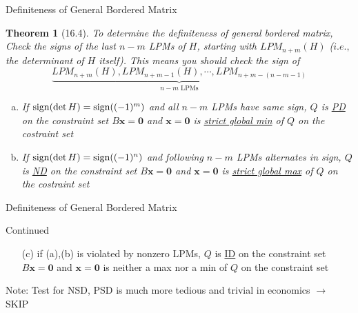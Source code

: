 \documentclass[a4paper,11pt]{article}
\newtheorem{thm}{Theorem}
\newcommand{\bd}{\mathbf}
\begin{document}
\begin{frame}[t]{Definiteness of General Bordered Matrix}
	\begin{thm}
		[16.4] To determine the definiteness of general bordered matrix, Check the signs of the last $n-m$ LPMs of $H$, starting with $LPM_{n+m}(H)$ ($i.e.,$ the determinant of $H$ itself). This means you should check the sign of \[
			\underbrace{LPM_{n+m}(H), LPM_{n+m-1}(H), \cdots,LPM_{n+m-(n-m-1)}}_{n-m\text{ LPMs}}
		\]
		\begin{enumerate}[(a)]
			\item If ${\rm sign}(\det H)={\rm sign}((-1)^m)$ and all $n-m$ LPMs have same sign, $Q$ is \uline{PD} on the constraint set $B\bd{x}=\bd{0}$ and $\bd{x}=\bd 0$ is \uline{strict global min} of $Q$ on the costraint set
			\item If ${\rm sign}(\det H)={\rm sign}((-1)^n)$ and following $n-m$ LPMs alternates in sign, $Q$ is \uline{ND} on the constraint set $B\bd{x}=\bd{0}$ and $\bd{x}=\bd 0$ is \uline{strict global max} of $Q$ on the costraint set
		\end{enumerate}
	\end{thm}
\end{frame}

\begin{frame}[t]{Definiteness of General Bordered Matrix}
	\begin{block}
		{Continued}
		\begin{enumerate}[(a)]
			\item [(c)] if (a),(b) is violated by nonzero LPMs, $Q$ is \uline{ID} on the constraint set $B\bd{x}=\bd{0}$ and $\bd{x}=\bd 0$ is neither a max nor a min of $Q$ on the constraint set
		\end{enumerate}
	\end{block}
	Note: Test for NSD, PSD is much more tedious and trivial in economics $\rightarrow$ SKIP
\end{frame}
\end{document}
